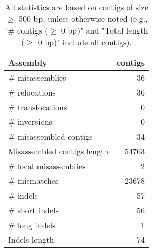 \documentclass[12pt,a4paper]{article}
\begin{document}
\begin{table}[ht]
\begin{center}
\caption{All statistics are based on contigs of size $\geq$ 500 bp, unless otherwise noted (e.g., "\# contigs ($\geq$ 0 bp)" and "Total length ($\geq$ 0 bp)" include all contigs).}
\begin{tabular}{|l*{1}{|r}|}
\hline
Assembly & contigs \\ \hline
\# misassemblies & 36 \\ \hline
\hspace{5mm}\# relocations & 36 \\ \hline
\hspace{5mm}\# translocations & 0 \\ \hline
\hspace{5mm}\# inversions & 0 \\ \hline
\# misassembled contigs & 34 \\ \hline
Misassembled contigs length & 54763 \\ \hline
\# local misassemblies & 2 \\ \hline
\# mismatches & 23678 \\ \hline
\# indels & 57 \\ \hline
\hspace{5mm}\# short indels & 56 \\ \hline
\hspace{5mm}\# long indels & 1 \\ \hline
Indels length & 74 \\ \hline
\end{tabular}
\end{center}
\end{table}
\end{document}
